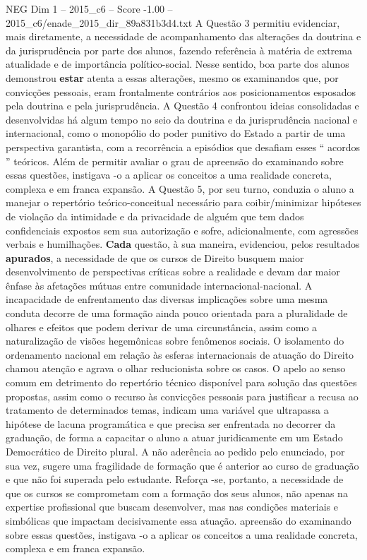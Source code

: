 \begin{textsample}{NEG Dim 1 – 2015\_c6 – Score -1.00 – 2015\_c6/enade\_2015\_dir\_89a831b3d4.txt}
A Questão 3 permitiu evidenciar, mais diretamente, a necessidade de acompanhamento das alterações da doutrina e da jurisprudência por parte dos alunos, fazendo referência à matéria de extrema atualidade e de importância político-social.
Nesse sentido, boa parte dos alunos demonstrou \textbf{estar} atenta a essas alterações, mesmo os examinandos que, por convicções pessoais, eram frontalmente contrários aos posicionamentos esposados pela doutrina e pela jurisprudência.
A Questão 4 confrontou ideias consolidadas e desenvolvidas há algum tempo no seio da doutrina e da jurisprudência nacional e internacional, como o monopólio do poder punitivo do Estado a partir de uma perspectiva garantista, com a recorrência a episódios que desafiam esses “ acordos ” teóricos.
Além de permitir avaliar o grau de apreensão do examinando sobre essas questões, instigava -o a aplicar os conceitos a uma realidade concreta, complexa e em franca expansão.
A Questão 5, por seu turno, conduzia o aluno a manejar o repertório teórico-conceitual necessário para coibir/minimizar hipóteses de violação da intimidade e da privacidade de alguém que tem dados confidenciais expostos sem sua autorização e sofre, adicionalmente, com agressões verbais e humilhações. \textbf{Cada} questão, à sua maneira, evidenciou, pelos resultados \textbf{apurados}, a necessidade de que os cursos de Direito busquem maior desenvolvimento de perspectivas críticas sobre a realidade e devam dar maior ênfase às afetações mútuas entre comunidade internacional-nacional.
A incapacidade de enfrentamento das diversas implicações sobre uma mesma conduta decorre de uma formação ainda pouco orientada para a pluralidade de olhares e efeitos que podem derivar de uma circunstância, assim como a naturalização de visões hegemônicas sobre fenômenos sociais.
O isolamento do ordenamento nacional em relação às esferas internacionais de atuação do Direito chamou atenção e agrava o olhar reducionista sobre os casos.
O apelo ao senso comum em detrimento do repertório técnico disponível para solução das questões propostas, assim como o recurso às convicções pessoais para justificar a recusa ao tratamento de determinados temas, indicam uma variável que ultrapassa a hipótese de lacuna programática e que precisa ser enfrentada no decorrer da graduação, de forma a capacitar o aluno a atuar juridicamente em um Estado Democrático de Direito plural.
A não aderência ao pedido pelo enunciado, por sua vez, sugere uma fragilidade de formação que é anterior ao curso de graduação e que não foi superada pelo estudante.
Reforça -se, portanto, a necessidade de que os cursos se comprometam com a formação dos seus alunos, não apenas na expertise profissional que buscam desenvolver, mas nas condições materiais e simbólicas que impactam decisivamente essa atuação. apreensão do examinando sobre essas questões, instigava -o a aplicar os conceitos a uma realidade concreta, complexa e em franca expansão.

\end{textsample}
